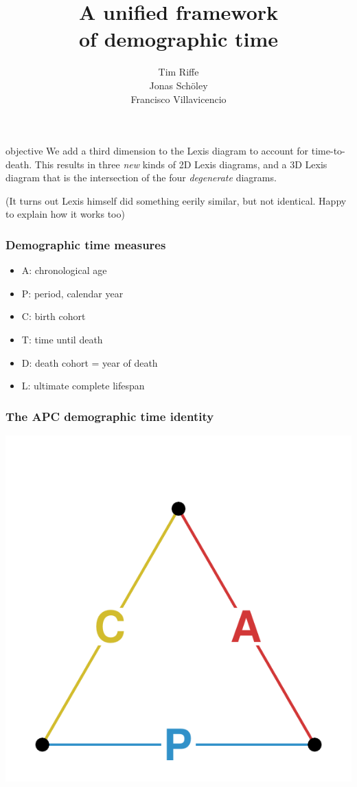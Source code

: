\documentclass[20pt]{beamer}
\title{A unified framework\\ of demographic time}
\subtitle{Tim Riffe \\ Jonas Sch{\"o}ley \\ Francisco Villavicencio}		%
\begin{document}

\begin{frame}
	\titlepage
\end{frame}
\begin{frame}
\begin{block}{objective}
We add a third dimension to the Lexis diagram to account for time-to-death. This
results in three \textit{new} kinds of 2D Lexis diagrams, and a 3D Lexis diagram
that is the intersection of the four \textit{degenerate} diagrams.
\end{block}
\color{mygray}(It turns out Lexis himself did something eerily similar, but not
identical. Happy to explain how it works too)

\end{frame}
\begin{frame}
\frametitle{Demographic time measures}
\begin{itemize}[<+->]
  \item A: chronological age
  \item P: period, calendar year
  \item C: birth cohort
  \item T: time until death
  \item D: death cohort = year of death
  \item L: ultimate complete lifespan
\end{itemize}
\end{frame}


\begin{frame}
\frametitle{The APC demographic time identity}
\vspace{-4em}
\begin{center}
\includegraphics[scale=1.7]{Figures/APCid.pdf}
\end{center}
\end{frame}
\end{document}
